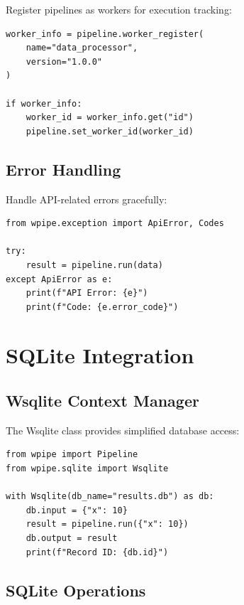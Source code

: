 \documentclass[12pt,a4paper]{report}
\begin{document}
Register pipelines as workers for execution tracking:

\begin{lstlisting}[caption={Worker Registration}, label={lst:worker-reg}]
worker_info = pipeline.worker_register(
    name="data_processor",
    version="1.0.0"
)

if worker_info:
    worker_id = worker_info.get("id")
    pipeline.set_worker_id(worker_id)
\end{lstlisting}

\section{Error Handling}

Handle API-related errors gracefully:

\begin{lstlisting}[caption={API Error Handling}, label={lst:api-error}]
from wpipe.exception import ApiError, Codes

try:
    result = pipeline.run(data)
except ApiError as e:
    print(f"API Error: {e}")
    print(f"Code: {e.error_code}")
\end{lstlisting}

\chapter{SQLite Integration}
\cleardoublepage

\section{Wsqlite Context Manager}

The Wsqlite class provides simplified database access:

\begin{lstlisting}[caption={Wsqlite Usage}, label={lst:wsqlite}]
from wpipe import Pipeline
from wpipe.sqlite import Wsqlite

with Wsqlite(db_name="results.db") as db:
    db.input = {"x": 10}
    result = pipeline.run({"x": 10})
    db.output = result
    print(f"Record ID: {db.id}")
\end{lstlisting}

\section{SQLite Operations}
\end{document}
